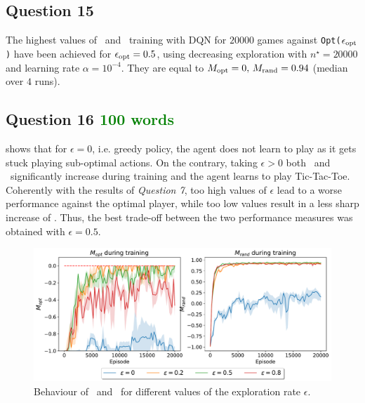 \documentclass[10pt]{IEEEtran}
\begin{document}
\subsection*{Question 15}
The highest values of \mopt\  and \mrand\  training with DQN for $20000$ games against \texttt{Opt($\epsilon_{\text{opt}}$)} have been achieved for $\epsilon_{\text{opt}} = 0.5$, using decreasing exploration with $n^{\star} = 20000$ and learning rate $\alpha = 10^{-4}$. They are equal to $M_{\text{opt}} = 0, \, M_{\text{rand}} = 0.94$ (median over $4$ runs).

\subsection*{Question 16 \textcolor{green}{100 words}}
 shows that for $\epsilon = 0$, i.e. greedy policy, the agent does not learn to play as it gets stuck playing sub-optimal actions. On the contrary, taking $\epsilon > 0$ both \mopt\ and \mrand\ significantly increase during training and the agent learns to play Tic-Tac-Toe. Coherently with the results of \emph{Question 7}, too high values of $\epsilon$ lead to a worse performance against the optimal player, while too low values result in a less sharp increase of \mrand. 
Thus, the best trade-off between the two performance measures was obtained with $\epsilon = 0.5$.
\begin{figure}[h]
    \centering
    \includegraphics[width = \linewidth]{code/figures/performance_epsilon_dqn_self.pdf}
    \caption{Behaviour of \mopt\ and \mrand\ for different values of the exploration rate $\epsilon$.}
    \label{plot_question16}
\end{figure}
\end{document}
